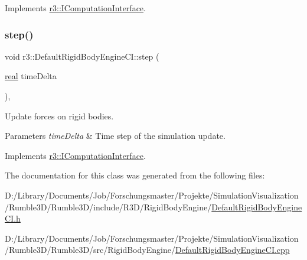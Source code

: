 Implements \mbox{\hyperlink{classr3_1_1_i_computation_interface_a6069989c54ffd4e714788d0968851007}{r3\+::\+I\+Computation\+Interface}}.

\mbox{\label{classr3_1_1_default_rigid_body_engine_c_i_ac45ae1d1889c75e6839b865870cbf59c}} 
\subsubsection{\texorpdfstring{step()}{step()}}
{\footnotesize\ttfamily void r3\+::\+Default\+Rigid\+Body\+Engine\+C\+I\+::step (\begin{DoxyParamCaption}\item[{\mbox{\hyperlink{namespacer3_ab2016b3e3f743fb735afce242f0dc1eb}{real}}}]{time\+Delta }\end{DoxyParamCaption})\hspace{0.3cm}{\ttfamily [override]}, {\ttfamily [virtual]}}



Update forces on rigid bodies. 


\begin{DoxyParams}{Parameters}
{\em time\+Delta} & Time step of the simulation update. \\
\hline
\end{DoxyParams}


Implements \mbox{\hyperlink{classr3_1_1_i_computation_interface_aaa12bcc35005f32a1984b38de97696cb}{r3\+::\+I\+Computation\+Interface}}.



The documentation for this class was generated from the following files\+:\begin{DoxyCompactItemize}
\item 
D\+:/\+Library/\+Documents/\+Job/\+Forschungsmaster/\+Projekte/\+Simulation\+Visualization/\+Rumble3\+D/\+Rumble3\+D/include/\+R3\+D/\+Rigid\+Body\+Engine/\mbox{\hyperlink{_default_rigid_body_engine_c_i_8h}{Default\+Rigid\+Body\+Engine\+C\+I.\+h}}\item 
D\+:/\+Library/\+Documents/\+Job/\+Forschungsmaster/\+Projekte/\+Simulation\+Visualization/\+Rumble3\+D/\+Rumble3\+D/src/\+Rigid\+Body\+Engine/\mbox{\hyperlink{_default_rigid_body_engine_c_i_8cpp}{Default\+Rigid\+Body\+Engine\+C\+I.\+cpp}}\end{DoxyCompactItemize}
